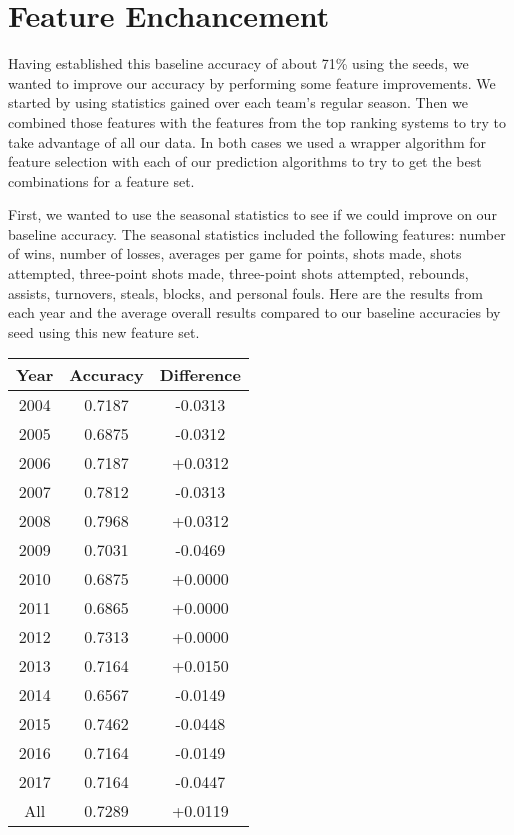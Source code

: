 \section{Feature Enchancement}
Having established this baseline accuracy of about 71\% using the seeds, we wanted to improve our accuracy by performing some feature improvements. 
We started by using statistics gained over each team’s regular season. 
Then we combined those features with the features from the top ranking systems to try to take advantage of all our data. 
In both cases we used a wrapper algorithm for feature selection with each of our prediction algorithms to try to get the best combinations for a feature set.

First, we wanted to use the seasonal statistics to see if we could improve on our baseline accuracy.
The seasonal statistics included the following features: number of wins, number of losses, averages per game for points, shots made, shots attempted, three-point shots made, three-point shots attempted, rebounds, assists, turnovers, steals, blocks, and personal fouls.
Here are the results from each year and the average overall results compared to our baseline accuracies by seed using this new feature set. 

\vspace{0.5cm}
\begin{tabular}{c c c}
    \toprule
    Year & Accuracy & Difference\\
    \midrule
    2004 & 0.7187 & -0.0313\\
    2005 & 0.6875 & -0.0312\\
    2006 & 0.7187 & +0.0312\\
    2007 & 0.7812 & -0.0313\\
    2008 & 0.7968 & +0.0312\\
    2009 & 0.7031 & -0.0469\\
    2010 & 0.6875 & +0.0000\\
    2011 & 0.6865 & +0.0000\\
    2012 & 0.7313 & +0.0000\\
    2013 & 0.7164 & +0.0150\\
    2014 & 0.6567 & -0.0149\\
    2015 & 0.7462 & -0.0448\\
    2016 & 0.7164 & -0.0149\\
    2017 & 0.7164 & -0.0447\\
    All & 0.7289 & +0.0119\\
    \bottomrule
\end{tabular}
\vspace{0.5cm}

